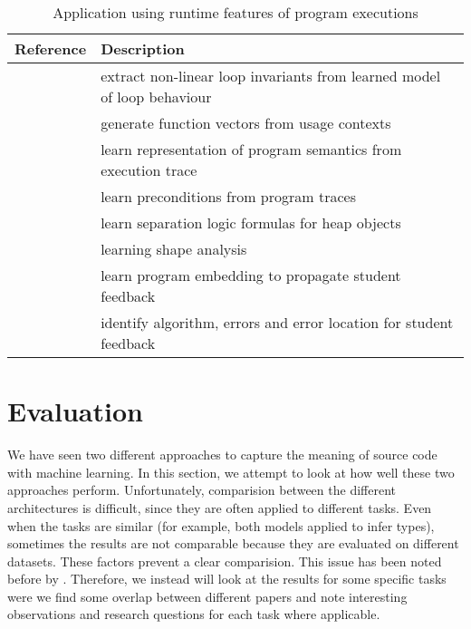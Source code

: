 \documentclass[sigconf,authordraft=true,nonacm=true]{acmart}
\begin{document}
\begin{table*}[t]
  \begin{tabularx}{\textwidth}{lX}
    \toprule
    Reference & Description \\
    \midrule
    \citet{yao_learning_2020} & extract non-linear loop invariants from learned model of loop behaviour \\
    \citet{henkel_code_2018} & generate function vectors from usage contexts \\
    \citet{wang_learning_2019} & learn representation of program semantics from execution trace \\
    \citet{padhi_data-driven_2016} & learn preconditions from program traces \\
    \citet{li_gated_2017} & learn separation logic formulas for heap objects \\
    \citet{brockschmidt_learning_2017} & learning shape analysis \\
    \citet{piech_learning_2015} & learn program embedding to propagate student feedback \\
    \citet{paasen_execution_2016} & identify algorithm, errors and error location for student feedback \\
    \bottomrule
  \end{tabularx}
  \caption{Application using runtime features of program executions}\label{tab:app-behaviour}
\end{table*}

\begin{figure}

\end{figure}


\section{Evaluation}\label{sec:eval}

We have seen two different approaches to capture the meaning of source code with machine learning.
In this section, we attempt to look at how well these two approaches perform.
Unfortunately, comparision between the different architectures is difficult, since they are often applied to different tasks.
Even when the tasks are similar (for example, both models applied to infer types), sometimes the results are not comparable because they are evaluated on different datasets.
These factors prevent a clear comparision.
This issue has been noted before by \citet[p. 71]{bourgeois_learning_2019}.
Therefore, we instead will look at the results for some specific tasks were we find some overlap between different papers and note interesting observations and research questions for each task where applicable.
\end{document}
